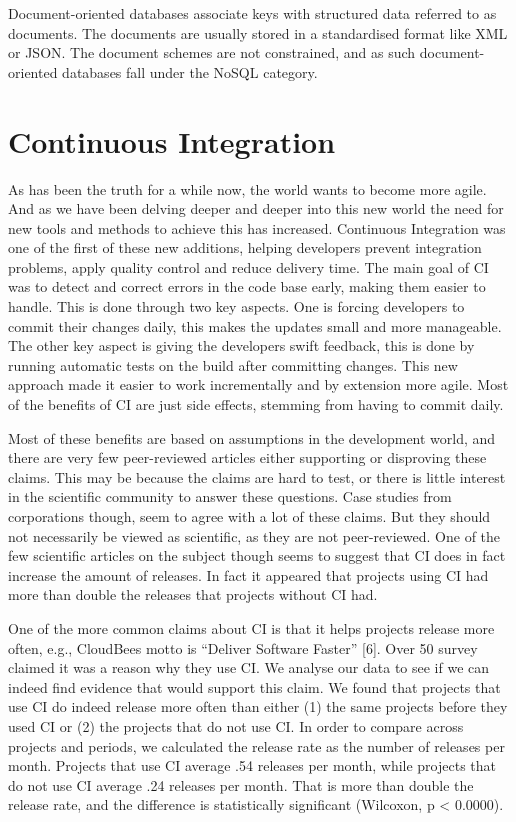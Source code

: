 Document-oriented databases associate keys with structured data referred to as documents. The documents are usually stored in a standardised format like XML or JSON\cite[p.~9]{nosql-ntnu}. The document schemes are not constrained, and as such document-oriented databases fall under the NoSQL category.

\section{Continuous Integration}
As has been the truth for a while now, the world wants to become more agile. And as we have been delving deeper and deeper into this new world the need for new tools and methods to achieve this has increased. Continuous Integration was one of the first of these new additions, helping developers prevent integration problems, apply quality control and reduce delivery time. The main goal of \gls{CI} was to detect and correct errors in the code base early, making them easier to handle. This is done through two key aspects. One is forcing developers to commit their changes daily, this makes the updates small and more manageable. The other key aspect is giving the developers swift feedback, this is done by running automatic tests on the build after committing changes. This new approach made it easier to work incrementally and by extension more agile. Most of the benefits of \gls{CI} are just side effects, stemming from having to commit daily.

Most of these benefits are based on assumptions in the development world, and there are very few peer-reviewed articles either supporting or disproving these claims. This may be because the claims are hard to test, or there is little interest in the scientific community to answer these questions. Case studies from corporations though, seem to agree with a lot of these claims. But they should not necessarily be viewed as scientific, as they are not peer-reviewed. One of the few scientific articles on the subject though seems to suggest that \gls{CI} does in fact increase the amount of releases. In fact it appeared that projects using CI had more than double the releases that projects without \gls{CI} had. 

\begin{displayquote}
One of the more common claims about CI is that it helps
projects release more often, e.g., CloudBees motto is “Deliver
Software Faster” [6]. Over 50%
survey claimed it was a reason why they use CI. We analyse
our data to see if we can indeed find evidence that would
support this claim.
We found that projects that use CI do indeed release more
often than either (1) the same projects before they used CI
or (2) the projects that do not use CI. In order to compare
across projects and periods, we calculated the release rate
as the number of releases per month. Projects that use CI
average .54 releases per month, while projects that do not
use CI average .24 releases per month. That is more than
double the release rate, and the difference is statistically
significant (Wilcoxon, p < 0.0000)\cite{hilton}.
\end{displayquote}

